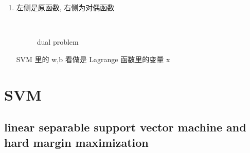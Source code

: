 \documentclass[oneside, 12pt]{ctexbook}
\begin{document}
\begin{enumerate}
					\item 左侧是原函数, 右侧为对偶函数
						\begin{figure}[H]
							\vspace{-0.3cm}  %
							\setlength{\abovecaptionskip}{-0.05cm}   %
							\centering
							\qquad
							\renewcommand{\figurename}{Fig} %
							\caption{ dual problem }
							\label{fig:9}
						\end{figure}
					
					
					SVM 里的 w,b 看做是 Lagrange 函数里的变量 x 
				\end{enumerate}
				
	\chapter{\quad SVM}
		\thispagestyle{fancy}
		\section{\quad linear separable support vector machine and hard margin maximization}
\end{document}
